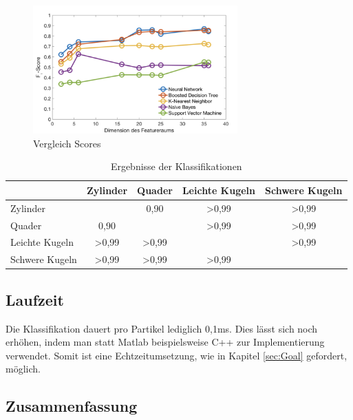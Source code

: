 \begin{figure}[!h]
    \centering
    \includegraphics[width=0.7\textwidth]{pics/VergleichScores.png}
    \caption{Vergleich Scores}
    \label{fig:VergleichScores}
\end{figure}

\begin{table}[!h]
\centering
\begin{tabular}{|p{3cm}|c|c|c|c|}
  \hline & Zylinder & Quader & Leichte Kugeln & Schwere Kugeln \\
  \hline Zylinder &	  & 0,90 & \textgreater0,99 & \textgreater0,99 \\
  \hline Quader & 0,90 &   & \textgreater0,99 & \textgreater0,99 \\
  \hline Leichte Kugeln & \textgreater0,99 & \textgreater0,99 &   & \textgreater0,99 \\
  \hline Schwere Kugeln & \textgreater0,99 & \textgreater0,99 & \textgreater0,99 &   \\
  \hline

 \end{tabular}
\caption{Ergebnisse der Klassifikationen}
\label{tab:Ergebnisse}
\end{table}







\subsection{Laufzeit}

Die Klassifikation dauert pro Partikel lediglich 0,1ms. Dies lässt sich noch erhöhen, indem man statt Matlab beispielsweise C++ zur Implementierung verwendet. Somit ist eine  Echtzeitumsetzung, wie in Kapitel \ref{sec:Goal} gefordert, möglich.




\subsection{Zusammenfassung}